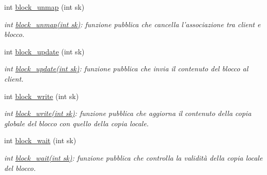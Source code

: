 \begin{CompactItemize}
int \hyperlink{classServer_da69667b5b906019f56db4d403412f89_da69667b5b906019f56db4d403412f89}{block\_\-unmap} (int sk)
\begin{CompactList}\small\item\em int \hyperlink{classServer_da69667b5b906019f56db4d403412f89_da69667b5b906019f56db4d403412f89}{block\_\-unmap(int sk)}: funzione pubblica che cancella l'associazione tra client e blocco. \item\end{CompactList}\item 
int \hyperlink{classServer_9207807bd61312d68333a6044855fe3f_9207807bd61312d68333a6044855fe3f}{block\_\-update} (int sk)
\begin{CompactList}\small\item\em int \hyperlink{classServer_9207807bd61312d68333a6044855fe3f_9207807bd61312d68333a6044855fe3f}{block\_\-update(int sk)}: funzione pubblica che invia il contenuto del blocco al client. \item\end{CompactList}\item 
int \hyperlink{classServer_40865edc01694851c5bf2318bd4e4d21_40865edc01694851c5bf2318bd4e4d21}{block\_\-write} (int sk)
\begin{CompactList}\small\item\em int \hyperlink{classServer_40865edc01694851c5bf2318bd4e4d21_40865edc01694851c5bf2318bd4e4d21}{block\_\-write(int sk)}: funzione pubblica che aggiorna il contenuto della copia globale del blocco con quello della copia locale. \item\end{CompactList}\item 
int \hyperlink{classServer_bebb2e77eafaa102863516f4b357a2f0_bebb2e77eafaa102863516f4b357a2f0}{block\_\-wait} (int sk)
\begin{CompactList}\small\item\em int \hyperlink{classServer_bebb2e77eafaa102863516f4b357a2f0_bebb2e77eafaa102863516f4b357a2f0}{block\_\-wait(int sk)}: funzione pubblica che controlla la validità della copia locale del blocco. \item\end{CompactList}\end{CompactItemize}
